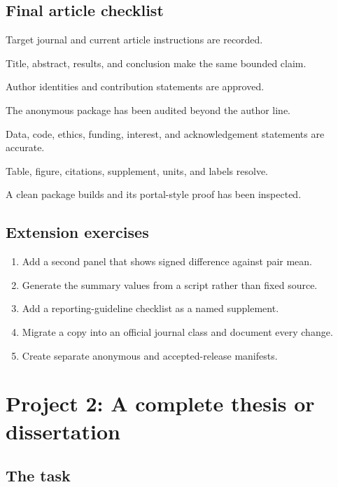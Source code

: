 \subsection{Final article checklist}

\begin{chapterchecklist}
  \item Target journal and current article instructions are recorded.
  \item Title, abstract, results, and conclusion make the same bounded claim.
  \item Author identities and contribution statements are approved.
  \item The anonymous package has been audited beyond the author line.
  \item Data, code, ethics, funding, interest, and acknowledgement statements are accurate.
  \item Table, figure, citations, supplement, units, and labels resolve.
  \item A clean package builds and its portal-style proof has been inspected.
\end{chapterchecklist}

\subsection{Extension exercises}

\begin{enumerate}
  \item Add a second panel that shows signed difference against pair mean.
  \item Generate the summary values from a script rather than fixed source.
  \item Add a reporting-guideline checklist as a named supplement.
  \item Migrate a copy into an official journal class and document every change.
  \item Create separate anonymous and accepted-release manifests.
\end{enumerate}

\section{Project 2: A complete thesis or dissertation}

\subsection{The task}

